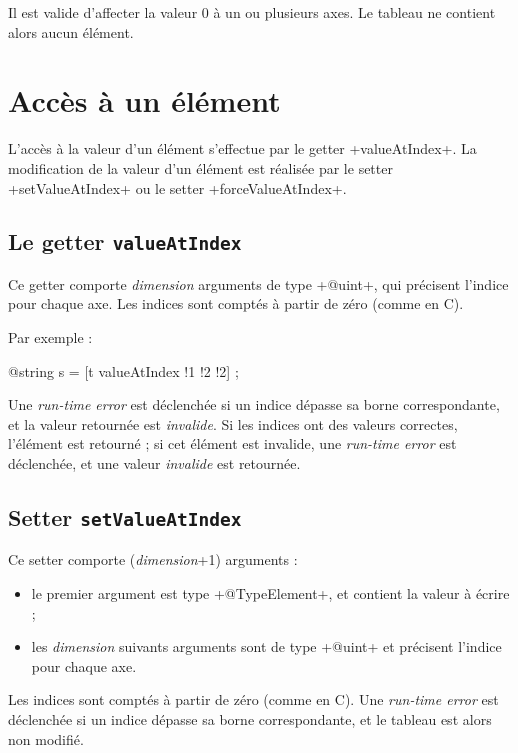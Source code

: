 Il est valide d'affecter la valeur $0$ à un ou plusieurs axes. Le tableau ne contient alors aucun élément.


\section{Accès à un élément}

L'accès à la valeur d'un élément s'effectue par le getter \ggs+valueAtIndex+. La modification de la valeur d'un élément est réalisée par le setter \ggs+setValueAtIndex+ ou le setter \ggs+forceValueAtIndex+.

\subsection{Le getter \texttt{valueAtIndex}}

Ce getter comporte \emph{dimension} arguments de type \ggs+@uint+, qui précisent l'indice pour chaque axe. Les indices sont comptés à partir de zéro (comme en C).

Par exemple :
\begin{galgas}
  @string s = [t valueAtIndex !1 !2 !2] ;
\end{galgas}


Une \emph{run-time error} est déclenchée si un indice dépasse sa borne correspondante, et la valeur retournée est \emph{invalide}. Si les indices ont des valeurs correctes, l'élément est retourné ; si cet élément est invalide, une \emph{run-time error} est déclenchée, et une valeur \emph{invalide} est retournée.






\subsection{Setter \texttt{setValueAtIndex}}

Ce setter comporte (\emph{dimension}+1) arguments :
\begin{itemize}
  \item le premier argument est type \ggs+@TypeElement+, et contient la valeur à écrire ;
  \item les \emph{dimension} suivants arguments sont de type \ggs+@uint+ et précisent l'indice pour chaque axe.
\end{itemize} 
  
Les indices sont comptés à partir de zéro (comme en C). Une \emph{run-time error} est déclenchée si un indice dépasse sa borne correspondante, et le tableau est alors non modifié.

